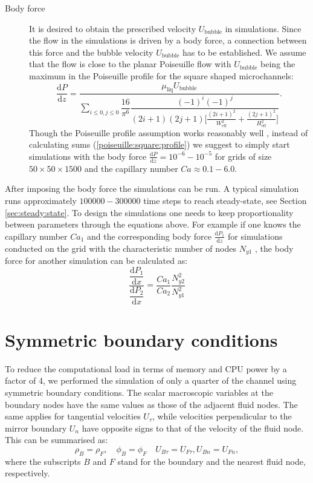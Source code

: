 \documentclass[preprint,12pt]{elsarticle}
\begin{document}
\begin{description}
\item[Body force] 
It is desired to obtain the prescribed velocity $U_{\mathrm{bubble}}$ in simulations. Since the
flow in the simulations is driven by a body force, a connection between this force and the
bubble velocity $U_{\mathrm{bubble}}$ has to be established. We assume that the
flow is close to the planar Poiseuille flow with $U_{\mathrm{bubble}}$ being the maximum in the
Poiseuille profile for the square shaped microchannels:
\begin{equation}
\label{poiseuille:square:profile}
\dfrac{\mathrm{d}P}{\mathrm{d}z}=\frac{\mu_{\mathrm{liq}} U_{\mathrm{bubble}}}{\sum_{i\leq 0,j\leq
0}{\dfrac{16}{\pi^6} \dfrac{(-1)^i (-1)^j}{(2 i+1)(2 j+1)\bigl[\frac{(2 i
+1)^2}{W_{\mathrm{eff}}^2}+\frac{(2 j+1)^2}{H_{\mathrm{eff}}^2}\bigr]}}}.
\end{equation}
Though the Poiseuille profile assumption works reasonably well \cite{kuzmin-binary2d}, instead of
calculating sums (\ref{poiseuille:square:profile}) we suggest to simply start simulations with the
body force $\frac{\mathrm{d}P}{\mathrm{d}z}=10^{-6}-10^{-5}$ for grids of size $50\times 50 \times
1500$ and the capillary number $Ca\approx0.1-6.0$.  
\end{description}
After imposing the body force the simulations can be run. A typical simulation runs approximately
$100000-300000$ time steps to reach steady-state, see Section \ref{sec:steady:state}. To design the
simulations one needs to keep proportionality between parameters through the equations above. For
example if one knows the capillary number $Ca_1$ and the corresponding body force
$\frac{\mathrm{d}P_1}{\mathrm{d}z}$ for simulations conducted on the grid with the characteristic
number of nodes $N_{y1}$ , the body force for another simulation can be calculated as:
\begin{equation}
\dfrac{\dfrac{\mathrm{d}P_1}{\mathrm{d}x}}{\dfrac{\mathrm{d}P_2}{\mathrm{d}x}}=\frac{Ca_1}{Ca_2}
\frac{N_{
y2}^2 }{N_{y1}^2}
\end{equation}

\section{Symmetric boundary conditions}
\label{append:sym}
To reduce the computational load in terms of memory and CPU power by a factor of 4, we performed the simulation of 
only a quarter of the channel using symmetric boundary conditions.  The scalar macroscopic variables
at the boundary nodes have the same values as those of the adjacent fluid nodes.  The same applies
for tangential velocities $U_{\tau}$, while velocities perpendicular  to the mirror boundary $U_n$ have opposite signs
to that of the velocity of the fluid node.  This can be summarised as:
\begin{equation}
\rho_B = \rho_F, \quad \phi_B = \phi_F \quad U_{B\tau}=U_{F\tau}, U_{B n}=U_{F n}, 
\end{equation}
where the subscripts $B$ and $F$ stand for the boundary and the nearest fluid node, respectively.
\end{document}
